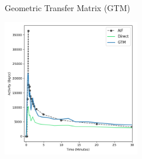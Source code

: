 \documentclass[aspectratio=169]{beamer}
\begin{document}
\begin{frame}[t]{Geometric Transfer Matrix (GTM)}
	\centering
	\begin{center}
		\includegraphics[height=6cm]{BADKA07504_1_bg_fg3.png}

	\end{center}
\end{frame}
\end{document}
